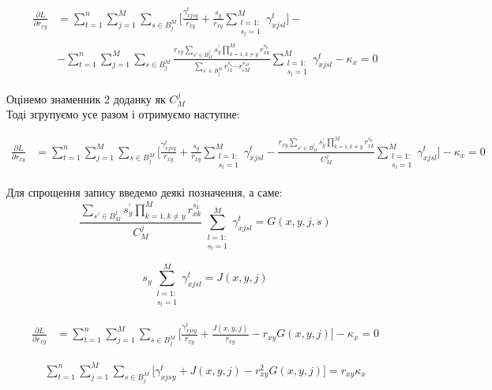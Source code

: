 \documentclass[14pt]{article}
\begin{document}
\begin{align*}
\frac{\partial L}{\partial r_{xy}} &= \sum_{t=1}^{n} \sum_{j=1}^{M} \sum_{s \in B^M_j} \Big[\frac{\gamma_{xjsy}^t }{r_{xy}} + 
\frac{s_y}{r_{xy}}\sum_{\substack{l=1:\\ s_l=1}}^{M} \gamma_{xjsl}^t \Big] - \\
& - \sum_{t=1}^{n} \sum_{j=1}^{M} \sum_{s \in B^M_j} \frac{r_{xy} \sum_{s' \in B^j_M} s^{'}_y \prod_{k=1,  k \neq y}^{M} r_{xk}^{s^{'}_k}}{\sum_{s^{'} \in B^M_j} r_{i1}^{s^{'}_1} \cdots r_{iM}^{s^{'}_M}} \sum_{\substack{l=1:\\ s_l=1}}^{M} \gamma_{xjsl}^t - \kappa_x = 0
\end{align*}

Оцінемо знаменник 2 доданку як $C_M^j$ \\ 

Тоді згрупуємо усе разом і отримуємо наступне:

\begin{align*}
\frac{\partial L}{\partial r_{xy}} &= \sum_{t=1}^{n} \sum_{j=1}^{M} \sum_{s \in B^M_j} \Big[\frac{\gamma_{xjsy}^t }{r_{xy}} + 
\frac{s_y}{r_{xy}}\sum_{\substack{l=1:\\ s_l=1}}^{M} \gamma_{xjsl}^t - \frac{r_{xy} \sum_{s' \in B^j_M} s^{'}_y \prod_{k=1,  k \neq y}^{M} r_{xk}^{s^{'}_k}}{C_M^j} \sum_{\substack{l=1:\\ s_l=1}}^{M} \gamma_{xjsl}^t \Big] - \kappa_x = 0
\end{align*}


\pagebreak
Для спрощення запису введемо деякі позначення, а саме:
$$
\frac{\sum_{s' \in B^j_M} s^{'}_y \prod_{k=1,  k \neq y}^{M} r_{xk}^{s^{'}_k}}{C_M^j}  \sum_{\substack{l=1:\\ s_l=1}}^{M} \gamma_{xjsl}^t = G(x, y, j, s)
$$

$$
s_y \sum_{\substack{l=1:\\ s_l=1}}^{M} \gamma_{xjsl}^t = J(x, y, j)
$$

\begin{align*}
\frac{\partial L}{\partial r_{xy}} &= \sum_{t=1}^{n} \sum_{j=1}^{M} \sum_{s \in B^M_j} \Big[\frac{\gamma_{xjsy}^t }{r_{xy}} + 
\frac{J(x, y, j)}{r_{xy}}- r_{xy} G(x, y, j)  \Big] - \kappa_x = 0
\end{align*}


\begin{align*}
\sum_{t=1}^{n} \sum_{j=1}^{M} \sum_{s \in B^M_j} \Big[\gamma_{xjsy}^t + 
J(x, y, j)- r_{xy}^{2} G(x, y, j) \Big] = r_{xy} \kappa_x
\end{align*}
\end{document}
